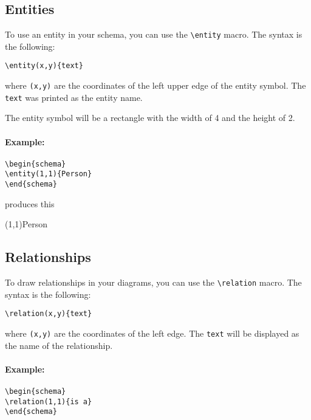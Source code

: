 \documentclass[a4paper,11pt]{article}
\begin{document}
\subsection{Entities}

To use an entity in your schema, you can use the \verb|\entity| macro.
The syntax is the following:

\begin{verbatim}
\entity(x,y){text}
\end{verbatim}

where {\tt (x,y)} are the coordinates of the left upper edge of the entity
symbol. The {\tt text} was printed as the entity name.

The entity symbol will be a rectangle with the width of 4 and the height of 2.

\paragraph{Example:}
\begin{verbatim}
\begin{schema}
\entity(1,1){Person}
\end{schema}
\end{verbatim}

produces this

\begin{schema}
\entity(1,1){Person}
\end{schema}

\subsection{Relationships}

To draw relationships in your diagrams, you can use the \verb|\relation| macro.
The syntax is the following:

\begin{verbatim}
\relation(x,y){text}
\end{verbatim}

where {\tt (x,y)} are the coordinates of the left edge. The {\tt text} will be displayed as 
the name of the relationship.

\paragraph{Example:}

\begin{verbatim}
\begin{schema}
\relation(1,1){is a}
\end{schema}
\end{verbatim}
\end{document}
